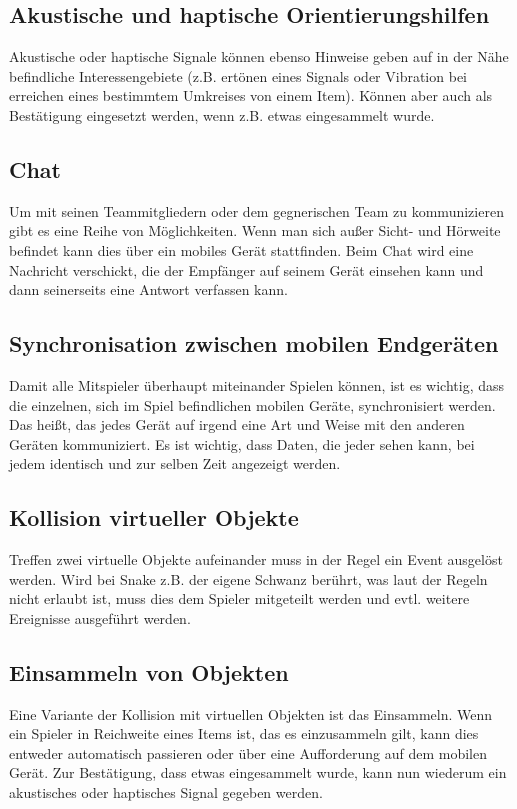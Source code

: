 \documentclass[runningheads,a4paper]{llncs}
\begin{document}
\subsection{Akustische und haptische Orientierungshilfen}

Akustische oder haptische Signale können ebenso Hinweise geben auf in der Nähe
befindliche Interessengebiete (z.B. ertönen eines Signals oder Vibration bei erreichen eines
bestimmtem Umkreises von einem Item). Können aber auch als Bestätigung eingesetzt
werden, wenn z.B. etwas eingesammelt wurde.

\subsection{Chat}

Um mit seinen Teammitgliedern oder dem gegnerischen Team zu kommunizieren gibt es
eine Reihe von Möglichkeiten. Wenn man sich außer Sicht- und Hörweite befindet kann
dies über ein mobiles Gerät stattfinden. Beim Chat wird eine Nachricht verschickt, die der
Empfänger auf seinem Gerät einsehen kann und dann seinerseits eine Antwort verfassen
kann.

\subsection{Synchronisation zwischen mobilen Endgeräten}

Damit alle Mitspieler überhaupt miteinander Spielen können, ist es wichtig, dass die
einzelnen, sich im Spiel befindlichen mobilen Geräte, synchronisiert werden. Das heißt, das
jedes Gerät auf irgend eine Art und Weise mit den anderen Geräten kommuniziert. Es ist
wichtig, dass Daten, die jeder sehen kann, bei jedem identisch und zur selben Zeit
angezeigt werden.

\subsection{Kollision virtueller Objekte}

Treffen zwei virtuelle Objekte aufeinander muss in der Regel ein Event ausgelöst werden.
Wird bei Snake z.B. der eigene Schwanz berührt, was laut der Regeln nicht erlaubt ist, muss
dies dem Spieler mitgeteilt werden und evtl. weitere Ereignisse ausgeführt werden.

\subsection{Einsammeln von Objekten}
Eine Variante der Kollision mit virtuellen Objekten ist das Einsammeln. Wenn ein Spieler in
Reichweite eines Items ist, das es einzusammeln gilt, kann dies entweder automatisch
passieren oder über eine Aufforderung auf dem mobilen Gerät. Zur Bestätigung, dass
etwas eingesammelt wurde, kann nun wiederum ein akustisches oder haptisches Signal
gegeben werden.
\end{document}
